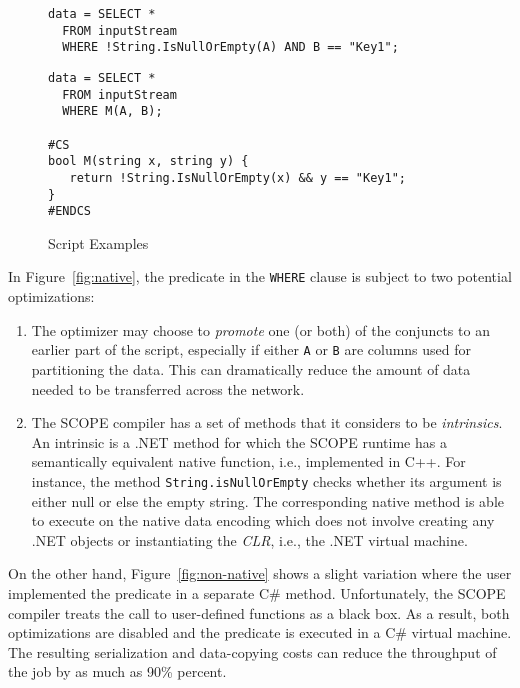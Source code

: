 \begin{figure}[ht]
 \begin{minipage}[b]{\linewidth}
  
   \begin{verbatim}
data = SELECT *
  FROM inputStream
  WHERE !String.IsNullOrEmpty(A) AND B == "Key1";
\end{verbatim}

    \label{fig:native}
  \end{minipage}
  \begin{minipage}[b]{\linewidth}
   \begin{verbatim}
data = SELECT *
  FROM inputStream
  WHERE M(A, B);

#CS
bool M(string x, string y) {
   return !String.IsNullOrEmpty(x) && y == "Key1";
}
#ENDCS
    \end{verbatim}

    \label{fig:non-native}
  \end{minipage}


\caption{Script Examples}
\label{fig:example}
\end{figure}

In Figure~\ref{fig:native}, the predicate in the {\tt WHERE} clause is subject to two potential optimizations:
\begin{enumerate}
\item The optimizer may choose to {\em promote} one (or both) of the conjuncts to an earlier part of the script, especially if either {\tt A} or {\tt B} are columns used for partitioning the data.
This can dramatically reduce the amount of data needed to be transferred across the network.
\item The SCOPE compiler has a set of methods that it considers to be {\em intrinsics}.
An intrinsic is a .NET method for which the SCOPE runtime has a semantically equivalent native function, i.e., implemented in C++.
For instance, the method {\tt String.isNullOrEmpty} checks whether its argument is either null or else the empty string.
The corresponding native method is able to execute on the native data encoding which does not involve creating any .NET objects or instantiating the {\em CLR}, i.e., the .NET virtual machine.
\end{enumerate}

On the other hand, Figure~\ref{fig:non-native} shows a slight variation where the user implemented the predicate in a separate C\# method. Unfortunately, the SCOPE compiler treats the call to user-defined functions as a black box. As a result, both optimizations are disabled and the predicate is executed in a C\# virtual machine. The resulting serialization and data-copying costs can reduce the throughput of the job by as much as 90\% percent. 


